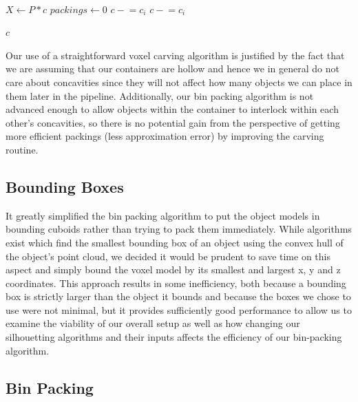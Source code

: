 \documentclass[10pt,twocolumn,letterpaper]{article}
\begin{document}
\begin{algorithmic}
 \\
    \State $X \gets P * c$
    \State $packings \gets 0$
            \State $c \mathrel{-}= c_i$
        \EndIf
            \State $c \mathrel{-}= c_i$
        \EndIf
    \EndFor
    
    \State \Return $c$
\EndFunction
\end{algorithmic}

Our use of a straightforward voxel carving algorithm is justified by the fact that we are assuming that our containers are hollow and hence we in general do not care about concavities since they will not affect how many objects we can place in them later in the pipeline. Additionally, our bin packing algorithm is not advanced enough to allow objects within the container to interlock within each other's concavities, so there is no potential gain from the perspective of getting more efficient packings (less approximation error) by improving the carving routine.

\subsection{Bounding Boxes}

It greatly simplified the bin packing algorithm to put the object models in bounding cuboids rather than trying to pack them immediately. While algorithms exist which find the smallest bounding box of an object using the convex hull of the object's point cloud, we decided it would be prudent to save time on this aspect and simply bound the voxel model by its smallest and largest x, y and z coordinates. This approach results in some inefficiency, both because a bounding box is strictly larger than the object it bounds and because the boxes we chose to use were not minimal, but it provides sufficiently good performance to allow us to examine the viability of our overall setup as well as how changing our silhouetting algorithms and their inputs affects the efficiency of our bin-packing algorithm.

\subsection{Bin Packing}
\end{document}
